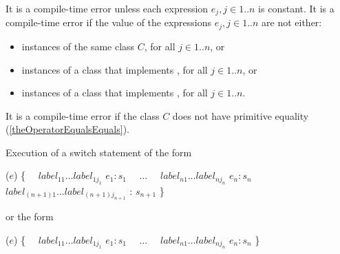 \documentclass[makeidx]{article}
\begin{document}
{\LMHash{}%
It is a compile-time error unless each expression
$e_j, j \in 1 .. n$ is constant.
It is a compile-time error if the value of the expressions
$e_j, j \in 1 .. n$ are not either:
\begin{itemize}
\item instances of the same class $C$, for all $j \in 1 .. n$, or
\item instances of a class that implements ,
  for all $j \in 1 .. n$, or
\item instances of a class that implements ,
  for all $j \in 1 .. n$.
\end{itemize}


\LMHash{}%
It is a compile-time error if the class $C$
does not have primitive equality
(\ref{theOperatorEqualsEquals}).



\LMHash{}%
Execution of a switch statement of the form

\begin{normativeDartCode}
\SWITCH{} ($e$) \{
\ \ $label_{11} \ldots label_{1j_1}$ \CASE{} $e_1: s_1$
\ \ $\ldots$
\ \ $label_{n1} \ldots label_{nj_n}$ \CASE{} $e_n: s_n$
\ \ $label_{(n+1)1} \ldots label_{(n+1)j_{n+1}}$ \DEFAULT{}: $s_{n+1}$
\}
\end{normativeDartCode}

or the form

\begin{normativeDartCode}
\SWITCH{} ($e$) \{
\ \ $label_{11} \ldots label_{1j_1}$ \CASE{} $e_1: s_1$
\ \ $\ldots$
\ \ $label_{n1} \ldots label_{nj_n}$ \CASE{} $e_n: s_n$
\}
\end{normativeDartCode}

}
\end{document}
